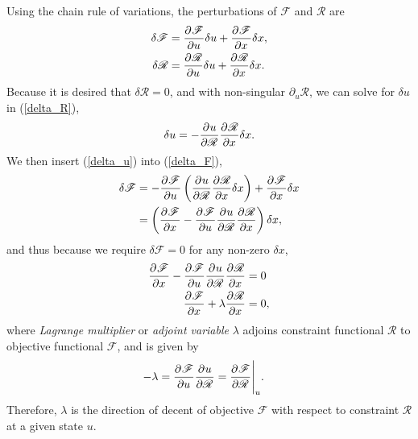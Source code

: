 Using the chain rule of variations, the perturbations of $\mathscr{F}$ and $\mathscr{R}$ are
\begin{align}
  \label{delta_F}
  \delta \mathscr{F} &= \frac{\partial^{} \mathscr{F}}{\partial u^{} } \delta u + \frac{\partial^{} \mathscr{F}}{\partial x^{} } \delta x, \\
  \label{delta_R}
  \delta \mathscr{R} &= \frac{\partial^{} \mathscr{R}}{\partial u^{} } \delta u + \frac{\partial^{} \mathscr{R}}{\partial x^{} } \delta x.
\end{align}
Because it is desired that $\delta \mathscr{R} = 0$, and with non-singular $\partial_{u} \mathscr{R}$, we can solve for $\delta u$ in (\ref{delta_R}),
\begin{align}
  \label{delta_u}
  \delta u = - \frac{\partial^{} u}{\partial \mathscr{R}^{} } \frac{\partial^{} \mathscr{R}}{\partial x^{} } \delta x.
\end{align}
We then insert (\ref{delta_u}) into (\ref{delta_F}),
\begin{align}
  \delta \mathscr{F} &= - \frac{\partial^{} \mathscr{F}}{\partial u^{} } \left( \frac{\partial^{} u}{\partial \mathscr{R}^{} } \frac{\partial^{} \mathscr{R}}{\partial x^{} } \delta x \right) + \frac{\partial^{} \mathscr{F}}{\partial x^{} } \delta x \notag \\
  &= \left(\frac{\partial^{} \mathscr{F}}{\partial x^{} }  - \frac{\partial^{} \mathscr{F}}{\partial u^{} } \frac{\partial^{} u}{\partial \mathscr{R}^{} } \frac{\partial^{} \mathscr{R}}{\partial x^{} } \right) \delta x,
\end{align}
and thus because we require $\delta \mathscr{F} = 0$ for any non-zero $\delta x$,
\begin{align}
  \frac{\partial^{} \mathscr{F}}{\partial x^{} } - \frac{\partial^{} \mathscr{F}}{\partial u^{} } \frac{\partial^{} u}{\partial \mathscr{R}^{} } \frac{\partial^{} \mathscr{R}}{\partial x^{} } &=0 \notag \\
  \label{condition_two}
  \frac{\partial^{} \mathscr{F}}{\partial x^{} } + \lambda \frac{\partial^{} \mathscr{R}}{\partial x^{} } &=0,
\end{align}
where  \emph{Lagrange multiplier} or  \emph{adjoint variable} $\lambda$  adjoins constraint functional $\mathscr{R}$ to objective functional $\mathscr{F}$, and is given by
\begin{align}
  -\lambda &= \frac{\partial^{} \mathscr{F}}{\partial u^{} } \frac{\partial^{} u}{\partial \mathscr{R}^{} } = \frac{\partial^{} \mathscr{F}}{\partial \mathscr{R}^{} } \Bigg|_{u}.
\end{align}
Therefore, $\lambda$ is the direction of decent of objective $\mathscr{F}$ with respect to constraint $\mathscr{R}$ at a given state $u$.

